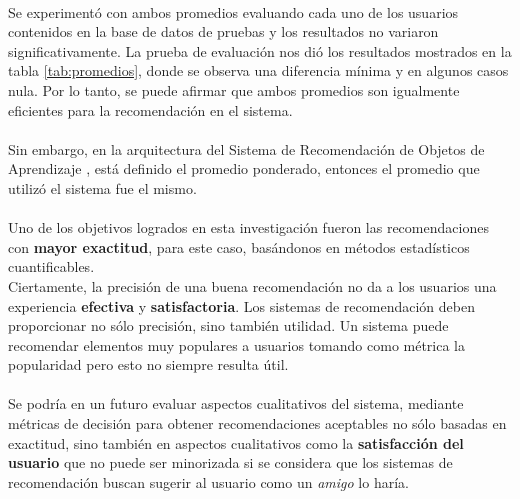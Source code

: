 \documentclass[12pt,letterpaper,oneside] {memoir}
\begin{document}
\paragraph{}
Se experimentó con ambos promedios evaluando cada uno de los usuarios contenidos en la base de datos de pruebas y los resultados no variaron significativamente.
La prueba de evaluación nos dió los resultados mostrados en la tabla \ref{tab:promedios}, donde se observa una diferencia mínima y en algunos casos nula. Por lo tanto, se puede afirmar que ambos promedios son igualmente eficientes  para la recomendación en el sistema. 
\paragraph{}
Sin embargo, en la arquitectura del Sistema de Recomendación de Objetos de Aprendizaje \citep{Garciavaldez2009}, está definido el promedio ponderado, entonces el promedio que utilizó el sistema 
fue el mismo.
\paragraph*{}
Uno de los objetivos logrados en esta investigación fueron las recomendaciones con \textbf{mayor exactitud}, para este caso, basándonos en métodos estadísticos cuantificables. \\
Ciertamente, la precisión de una buena recomendación no da a los usuarios una experiencia \textbf{efectiva} y \textbf{satisfactoria}. Los sistemas de recomendación deben proporcionar no sólo precisión, sino también utilidad. Un sistema puede recomendar elementos muy populares  a usuarios tomando como métrica la popularidad pero esto no siempre resulta útil.
\paragraph*{}
Se podría en un futuro evaluar aspectos cualitativos del sistema, mediante métricas de decisión para obtener recomendaciones aceptables no sólo basadas en exactitud, sino también en aspectos cualitativos como la \textbf{satisfacción del usuario} que no puede ser minorizada si se considera que los sistemas de recomendación buscan sugerir al usuario como un \textit{amigo} lo haría.
\end{document}

